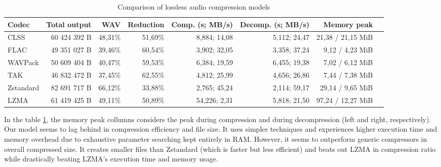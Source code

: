 \begin{table}[htbp]
    \centering
    \caption{Comparison of lossless audio compression models}
    \label{tab:codec_comparison}
    \small
    \begin{tabular}{lrrrrrrr}
        \toprule
        \textbf{Codec} &
        \textbf{Total output} &
        \textbf{WAV} &
        \textbf{Reduction} &
        \textbf{Comp. (s; MB/s)} &
        \textbf{Decomp. (s; MB/s)} &
        \textbf{Memory peak} \\
        \midrule
        CLSS
        & 60 424 392 B
        & 48,31\%
        & 51,69\%
        & 8,884; 14,08
        & 5,112; 24,47
        & 21,38 / 21,15 MiB \\

        FLAC
        & 49 351 027 B
        & 39,46\%
        & 60,54\%
        & 3,902; 32,05
        & 3,358; 37,24
        & 9,12 / 4,23 MiB \\

        WAVPack
        & 50 609 404 B
        & 40,47\%
        & 59,53\%
        & 6,384; 19,59
        & 6,455; 19,38
        & 7,02 / 6,12 MiB \\

        TAK
        & 46 832 472 B
        & 37,45\%
        & 62,55\%
        & 4,812; 25,99
        & 4,656; 26,86
        & 7,44 / 7,38 MiB \\

        Zstandard
        & 82 691 717 B
        & 66,12\%
        & 33,88\%
        & 2,765; 45,24
        & 2,114; 59,17
        & 29,14 / 9,65 MiB \\

        LZMA
        & 61 419 425 B
        & 49,11\%
        & 50,89\%
        & 54,226; 2,31
        & 5,818; 21,50
        & 97,24 / 12,27 MiB \\
        \bottomrule
    \end{tabular}
\end{table}

In the table \ref{tab:codec_comparison}, the memory peak collumns considers the peak during compression and during decompression (left and right, respectively). Our model seems to lag behind in compression efficiency and file size. It uses simpler techniques and experiences higher execution time and memory overhead due to exhaustive parameter searching kept entirely in RAM. However, it seems to outperform generic compressors in overall compressed size. It creates smaller files than Zstandard (which is faster but less efficient) and beats out LZMA in compression ratio while drastically beating LZMA's execution time and memory usage.

